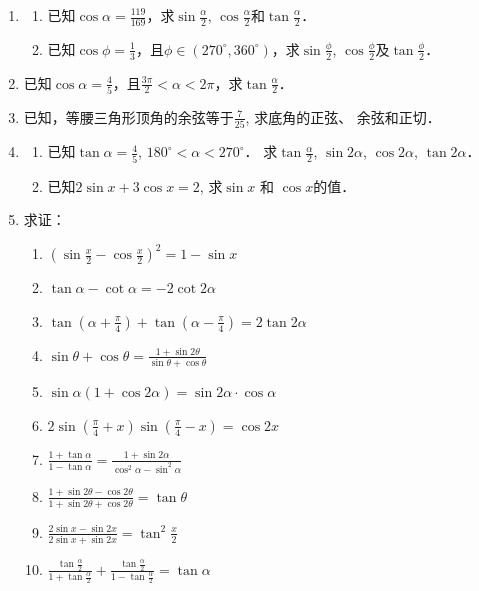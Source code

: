 \begin{enumerate}
\item \begin{enumerate}
    \item 已知$\cos\alpha =\frac{119}{169}$，求$\sin\frac{\alpha}{2}$, $\cos\frac{\alpha}{2}$和$\tan\frac{\alpha}{2}$．
    \item 已知$\cos\phi=\frac{1}{3}$，且$\phi\in(270^{\circ}, 360^{\circ})$，求$\sin\frac{\phi}{2}$, $\cos\frac{\phi}{2}$及$\tan\frac{\phi}{2}$．
\end{enumerate}
\item 已知$\cos\alpha=\frac{4}{5}$，且$\frac{3\pi}{2}<\alpha<2\pi$，求$\tan\frac{\alpha}{2}$．
\item 已知，等腰三角形顶角的余弦等于$\frac{7}{25}$, 求底角的正弦、
余弦和正切．
\item \begin{enumerate}
    \item 已知$\tan\alpha=\frac{4}{5}$, $180^{\circ}<\alpha<270^{\circ}$．
求$\tan\frac{\alpha}{2}$, $\sin2\alpha$, $\cos2\alpha$, $\tan 2\alpha$．
\item 已知$2\sin x+3\cos x=2$, 
求$\sin x$ 和 $\cos x$的值．
\end{enumerate}

\item 求证：
\begin{enumerate}
    \item $\left(\sin\frac{x}{2}-\cos\frac{x}{2}\right)^2=1-\sin x$
    \item $\tan\alpha-\cot\alpha=-2\cot 2\alpha$
    \item $\tan\left(\alpha+\frac{\pi}{4}\right)+\tan\left(\alpha-\frac{\pi}{4}\right)=2\tan 2\alpha$
    \item $\sin\theta+\cos\theta=\frac{1+\sin2\theta}{\sin\theta+\cos\theta}$
    \item $\sin\alpha(1+\cos2\alpha)=\sin2\alpha\cdot \cos\alpha$
    \item $2\sin\left(\frac{\pi}{4}+x\right)\sin\left(\frac{\pi}{4}-x\right)=\cos2x$
    \item $\frac{1+\tan\alpha}{1-\tan\alpha}=\frac{1+\sin2\alpha}{\cos^2\alpha-\sin^2\alpha}$
    \item $\frac{1+\sin2\theta-\cos2\theta}{1+\sin2\theta+\cos2\theta}=\tan\theta$
    \item $\frac{2\sin x-\sin2x}{2\sin x+\sin2x}=\tan^2\frac{x}{2}$
    \item $\frac{\tan\frac{\alpha}{2}}{1+\tan\frac{\alpha}{2}}+\frac{\tan\frac{\alpha}{2}}{1-\tan\frac{\alpha}{2}}=\tan\alpha$
\end{enumerate}


\end{enumerate}
